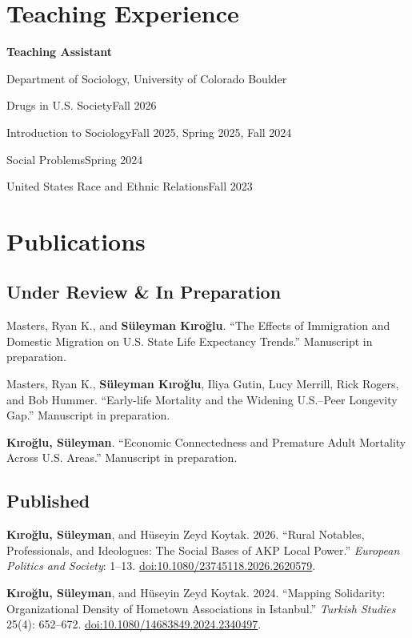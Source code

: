 \documentclass[11pt,letterpaper]{article}
\newcommand{\dated}[2]{#1\hfill{\sffamily\small\color{muted}#2}\par\smallskip}
\newcommand{\me}[1]{\textbf{#1}}
\newcommand{\doi}[1]{\mbox{\href{https://doi.org/#1}{doi:#1}}}
\begin{document}
\section{Teaching Experience}
\textbf{Teaching Assistant}\par
Department of Sociology, University of Colorado Boulder\par
\smallskip
\dated{Drugs in U.S. Society}{Fall 2026}
\dated{Introduction to Sociology}{Fall 2025, Spring 2025, Fall 2024}
\dated{Social Problems}{Spring 2024}
\dated{United States Race and Ethnic Relations}{Fall 2023}

\section{Publications}

\subsection{Under Review \& In Preparation}
\begin{cites}
  \item Masters, Ryan K., and \me{Süleyman Kıroğlu}. ``The Effects of Immigration
    and Domestic Migration on U.S. State Life Expectancy Trends.'' Manuscript in preparation.
  \item Masters, Ryan K., \me{Süleyman Kıroğlu}, Iliya Gutin, Lucy Merrill, Rick Rogers,
    and Bob Hummer. ``Early-life Mortality and the Widening U.S.--Peer Longevity Gap.''
    Manuscript in preparation.
  \item \me{Kıroğlu, Süleyman}. ``Economic Connectedness and Premature Adult Mortality
    Across U.S. Areas.''
    Manuscript in preparation.
\end{cites}

\subsection{Published}
\begin{cites}
  \item \me{Kıroğlu, Süleyman}, and Hüseyin Zeyd Koytak. 2026. ``Rural Notables,
    Professionals, and Ideologues: The Social Bases of AKP Local Power.''
    \textit{European Politics and Society}: 1--13.
    \doi{10.1080/23745118.2026.2620579}.
  \item \me{Kıroğlu, Süleyman}, and Hüseyin Zeyd Koytak. 2024. ``Mapping Solidarity:
    Organizational Density of Hometown Associations in Istanbul.''
    \textit{Turkish Studies} 25(4): 652--672.
    \doi{10.1080/14683849.2024.2340497}.
\end{cites}
\end{document}
